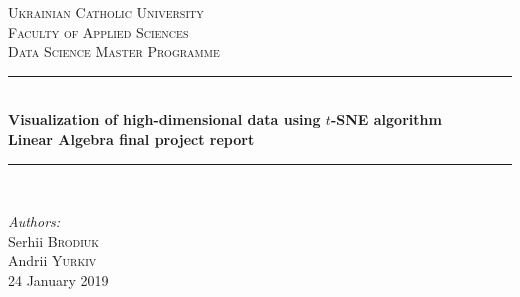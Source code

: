 \begin{titlepage}

\newcommand{\HRule}{\rule{\linewidth}{0.5mm}} %

\center %
 

\textsc{\LARGE Ukrainian Catholic University}\\[1cm] %
\textsc{\Large  Faculty of Applied Sciences}\\[0.5cm] %
\textsc{\large Data Science Master Programme}\\[0.5cm] %

\vspace*{1cm}

\HRule \\[0.4cm]
{ \huge \bfseries Visualization of high-dimensional data using $t$-SNE algorithm}\\[10pt]
{\Large \bfseries Linear Algebra final project report}\\[0.4cm] %
\HRule \\[1cm]
 
\vspace*{1cm}

\Large \emph{Authors:}\\
Serhii \textsc{Brodiuk}\\Andrii \textsc{Yurkiv}\\[1cm] %

\vspace*{1cm}
{\large 24 January 2019}\\[2cm] %


\end{titlepage}
